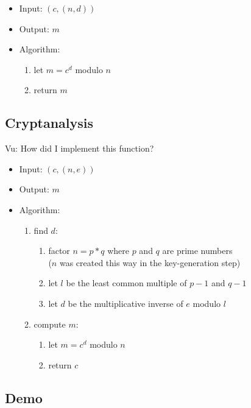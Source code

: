 \begin{itemize}
\item Input: $(c, (n, d))$
\item Output: $m$
\item Algorithm:
  \begin{enumerate}
  \item let $m = c^d$ modulo $n$
  \item return $m$
  \end{enumerate}
\end{itemize}


\subsection{Cryptanalysis}

Vu:
How did I implement this function?

\begin{itemize}
\item Input: $(c, (n, e))$
\item Output: $m$
\item Algorithm:
  \begin{enumerate}
  \item find $d$:
    \begin{enumerate}
    \item factor $n = p * q$ where
      $p$ and $q$ are prime numbers \\
      ($n$ was created this way in the key-generation step)
    \item let $l$ be the least common multiple of
      $p - 1$ and $q - 1$
    \item let $d$ be the multiplicative inverse of $e$
      modulo $l$
    \end{enumerate}
  \item compute $m$:
    \begin{enumerate}
    \item let $m = c^d$ modulo $n$
    \item return $c$
    \end{enumerate}
  \end{enumerate}
\end{itemize}


\subsection{Demo}

\codes{}
